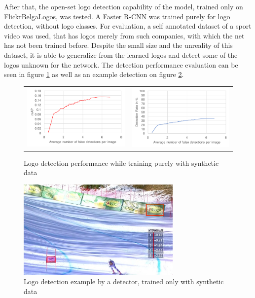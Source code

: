 After that, the open-set logo detection capability of the model, trained only on FlickrBelgaLogos, was tested. A Faster R-CNN was trained purely for logo detection, without logo classes. For evaluation, a self annotated dataset of a sport video was used, that has logos merely from such companies, with which the net has not been trained before. Despite the small size and the unreality of this dataset, it is able to generalize from the learned logos and detect some of the logos unknown for the network. The detection performance evaluation can be seen in figure \ref{f:flbldeteval} as well as an example detection on figure \ref{f:flbldetexample}.

\begin{figure}
  \centering
  \begin{tabular}{cc}
    \includegraphics[width=80mm]{images/mt/flbl_det_map.png} & \includegraphics[width=80mm]{images/mt/flbl_det_froc.png}
  \end{tabular}
  \caption{Logo detection performance while training purely with synthetic data}
  \label{f:flbldeteval}
\end{figure}
\begin{figure}
  \centering
  \includegraphics[width=80mm]{images/mt/flbl_det.png}
  \caption{Logo detection example by a detector, trained only with synthetic data}
  \label{f:flbldetexample}
\end{figure}
\bigbreak
